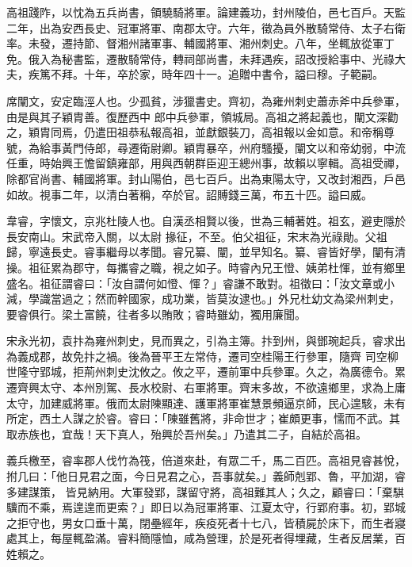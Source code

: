 \begin{pinyinscope}
 高祖踐阼，以忱為五兵尚書，領驍騎將軍。論建義功，封州陵伯，邑七百戶。天監二年，出為安西長史、冠軍將軍、南郡太守。六年，徵為員外散騎常侍、太子右衛率。未發，遷持節、督湘州諸軍事、輔國將軍、湘州刺史。八年，坐輒放從軍丁免。俄入為秘書監，遷散騎常侍，轉祠部尚書，未拜遇疾，詔改授給事中、光祿大夫，疾篤不拜。十年，卒於家，時年四十一。追贈中書令，謚曰穆。子範嗣。



 席闡文，安定臨涇人也。少孤貧，涉獵書史。齊初，為雍州刺史蕭赤斧中兵參軍，由是與其子穎胄善。復歷西中
 郎中兵參軍，領城局。高祖之將起義也，闡文深勸之，穎胄同焉，仍遣田祖恭私報高祖，並獻銀裝刀，高祖報以金如意。和帝稱尊號，為給事黃門侍郎，尋遷衛尉卿。穎胄暴卒，州府騷擾，闡文以和帝幼弱，中流任重，時始興王憺留鎮雍部，用與西朝群臣迎王總州事，故賴以寧輯。高祖受禪，除都官尚書、輔國將軍。封山陽伯，邑七百戶。出為東陽太守，又改封湘西，戶邑如故。視事二年，以清白著稱，卒於官。詔賻錢三萬，布五十匹。謚曰威。



 韋睿，字懷文，京兆杜陵人也。自漢丞相賢以後，世為三輔著姓。祖玄，避吏隱於長安南山。宋武帝入關，以太尉
 掾征，不至。伯父祖征，宋末為光祿勛。父祖歸，寧遠長史。睿事繼母以孝聞。睿兄纂、闡，並早知名。纂、睿皆好學，闡有清操。祖征累為郡守，每攜睿之職，視之如子。時睿內兄王憕、姨弟杜惲，並有鄉里盛名。祖征謂睿曰：「汝自謂何如憕、惲？」睿謙不敢對。祖徵曰：「汝文章或小減，學識當過之；然而幹國家，成功業，皆莫汝逮也。」外兄杜幼文為梁州刺史，要睿俱行。梁土富饒，往者多以賄敗；睿時雖幼，獨用廉聞。



 宋永光初，袁抃為雍州刺史，見而異之，引為主簿。抃到州，與鄧琬起兵，睿求出為義成郡，故免抃之禍。後為晉平王左常侍，遷司空桂陽王行參軍，隨齊
 司空柳世隆守郢城，拒荊州刺史沈攸之。攸之平，遷前軍中兵參軍。久之，為廣德令。累遷齊興太守、本州別駕、長水校尉、右軍將軍。齊末多故，不欲遠鄉里，求為上庸太守，加建威將軍。俄而太尉陳顯達、護軍將軍崔慧景頻逼京師，民心遑駭，未有所定，西土人謀之於睿。睿曰：「陳雖舊將，非命世才；崔頗更事，懦而不武。其取赤族也，宜哉！天下真人，殆興於吾州矣。」乃遣其二子，自結於高祖。



 義兵檄至，睿率郡人伐竹為筏，倍道來赴，有眾二千，馬二百匹。高祖見睿甚悅，拊几曰：「他日見君之面，今日見君之心，吾事就矣。」義師剋郢、魯，平加湖，睿多建謀策，
 皆見納用。大軍發郢，謀留守將，高祖難其人；久之，顧睿曰：「棄騏驥而不乘，焉遑遑而更索？」即日以為冠軍將軍、江夏太守，行郢府事。初，郢城之拒守也，男女口垂十萬，閉壘經年，疾疫死者十七八，皆積屍於床下，而生者寢處其上，每屋輒盈滿。睿料簡隱恤，咸為營理，於是死者得埋藏，生者反居業，百姓賴之。




\end{pinyinscope}
